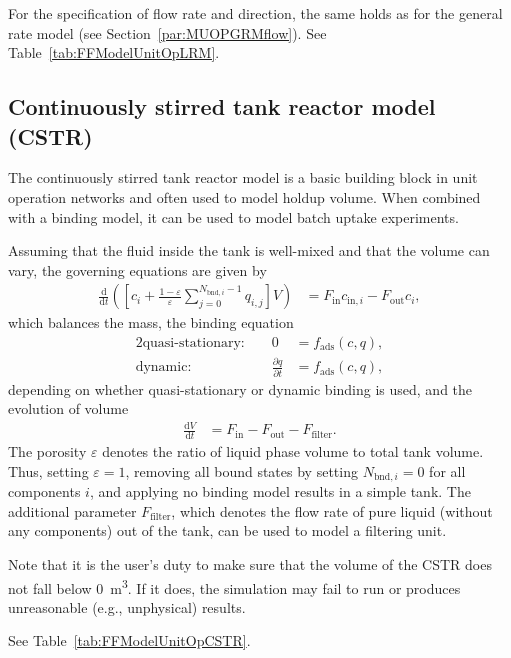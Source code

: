 For the specification of flow rate and direction, the same holds as for the general rate model (see Section~\ref{par:MUOPGRMflow}).
See Table~\ref{tab:FFModelUnitOpLRM}.

\subsection{Continuously stirred tank reactor model (CSTR)}\label{sec:MUOPCSTR}

The continuously stirred tank reactor model  is a basic building block in unit operation networks and often used to model holdup volume.
When combined with a binding model, it can be used to model batch uptake experiments.

Assuming that the fluid inside the tank is well-mixed and that the volume can vary, the governing equations are given by
\begin{align*}
	\frac{\mathrm{d}}{\mathrm{d}t} \left(\left[ c_i + \frac{1-\varepsilon}{\varepsilon} \sum_{j=0}^{N_{\text{bnd},i} - 1} q_{i,j} \right] V\right) &= F_{\text{in}} c_{\text{in},i} - F_{\text{out}} c_i,
\end{align*}
which balances the mass, the binding equation
\begin{alignat*}{2}
	\text{quasi-stationary: }& & 0 &= f_{\text{ads}}( c, q), \\
	\text{dynamic: }& & \frac{\partial q}{\partial t} &= f_{\text{ads}}( c, q),
\end{alignat*}
depending on whether quasi-stationary or dynamic binding is used, and the evolution of volume
\begin{align*}
	\frac{\mathrm{d}V}{\mathrm{d}t} &= F_{\text{in}} - F_{\text{out}} - F_{\text{filter}}.
\end{align*}
The porosity $\varepsilon$ denotes the ratio of liquid phase volume to total tank volume.
Thus, setting $\varepsilon = 1$, removing all bound states by setting $N_{\text{bnd},i} = 0$ for all components $i$, and applying no binding model results in a simple tank.
The additional parameter $F_{\text{filter}}$, which denotes the flow rate of pure liquid (without any components) out of the tank, can be used to model a filtering unit.

Note that it is the user's duty to make sure that the volume of the CSTR does not fall below \SI{0}{\cubic\metre}.
If it does, the simulation may fail to run or produces unreasonable (e.g., unphysical) results.

See Table~\ref{tab:FFModelUnitOpCSTR}.
